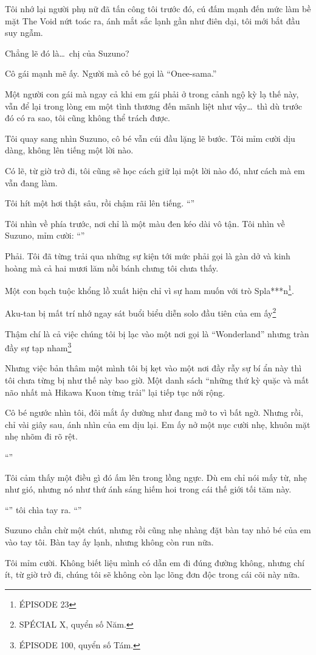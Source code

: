 \documentclass[../main.tex]{subfiles}
\begin{document}
Tôi nhớ lại người phụ nữ đã tấn công tôi trước đó, cú đấm mạnh đến mức làm bề mặt The Void nứt toác ra, ánh mắt sắc lạnh gần như điên dại, tôi mới bắt đầu suy ngẫm.

Chẳng lẽ đó là\dots\ chị của Suzuno?

Cô gái mạnh mẽ ấy. Người mà cô bé gọi là ``Onee-sama.''

Một người con gái mà ngay cả khi em gái phải ở trong cảnh ngộ kỳ lạ thế này, vẫn để lại trong lòng em một tình thương đến mãnh liệt như vậy\dots\ thì dù trước đó có ra sao, tôi cũng không thể trách được.

Tôi quay sang nhìn Suzuno, cô bé vẫn cúi đầu lặng lẽ bước. Tôi mỉm cười dịu dàng, không lên tiếng một lời nào.

Có lẽ, từ giờ trở đi, tôi cũng sẽ học cách giữ lại một lời nào đó, như cách mà em vẫn đang làm.

Tôi hít một hơi thật sâu, rồi chậm rãi lên tiếng. ``''

Tôi nhìn về phía trước, nơi chỉ là một màu đen kéo dài vô tận. Tôi nhìn về Suzuno, mỉm cười: ``''

Phải. Tôi đã từng trải qua những sự kiện tới mức phải gọi là gàn dở và kinh hoàng mà cả hai mươi lăm nồi bánh chưng tôi chưa thấy.

Một con bạch tuộc khổng lồ xuất hiện chỉ vì sự ham muốn với trò Spla***n\footnote{{\flaregothic ÉPISODE 23}}.

Aku-tan bị mất trí nhớ ngay sát buổi biểu diễn solo đầu tiên của em ấy\footnote{{\flaregothic SPÉCIAL \ab X}, quyển số Năm.}

Thậm chí là cả việc chúng tôi bị lạc vào một nơi gọi là ``Wonderland'' nhưng tràn đầy sự tạp nham\footnote{{\flaregothic ÉPISODE 100}, quyển số Tám.}

Nhưng việc bản thâm một mình tôi bị kẹt vào một nơi đầy rẫy sự bí ẩn này thì tôi chưa từng bị như thế này bao giờ. Một danh sách ``những thứ kỳ quặc và mất não nhất mà Hikawa Kuon từng trải'' lại tiếp tục nới rộng.

Cô bé ngước nhìn tôi, đôi mắt ấy dường như đang mở to vì bất ngờ. Nhưng rồi, chỉ vài giây sau, ánh nhìn của em dịu lại. Em ấy nở một nục cười nhẹ, khuôn mặt nhẹ nhõm đi rõ rệt.

``''

Tôi cảm thấy một điều gì đó ấm lên trong lồng ngực. Dù em chỉ nói mấy từ, nhẹ như gió, nhưng nó như thứ ánh sáng hiếm hoi trong cái thế giới tối tăm này.

``'' tôi chìa tay ra. ``''

Suzuno chần chừ một chút, nhưng rồi cũng nhẹ nhàng đặt bàn tay nhỏ bé của em vào tay tôi. Bàn tay ấy lạnh, nhưng không còn run nữa.

Tôi mỉm cười. Không biết liệu mình có dẫn em đi đúng đường không, nhưng chí ít, từ giờ trở đi, chúng tôi sẽ không còn lạc lõng đơn độc trong cái cõi này nữa.
\end{document}
